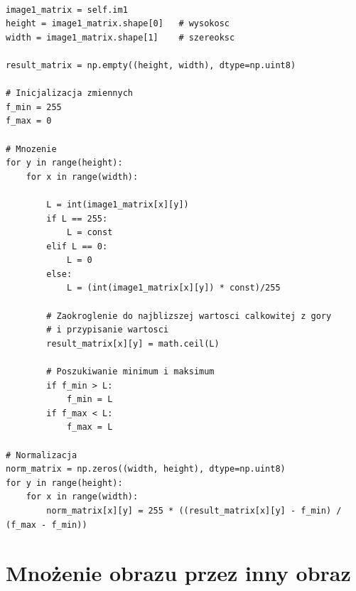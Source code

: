 \documentclass[final,a4paper,openany,12pt]{mwbk}
\begin{document}
\begin{lstlisting}[caption=Mnożenie obrazu szarego przez zadaną liczbę]

image1_matrix = self.im1
height = image1_matrix.shape[0]   # wysokosc
width = image1_matrix.shape[1]    # szereoksc

result_matrix = np.empty((height, width), dtype=np.uint8)

# Inicjalizacja zmiennych
f_min = 255
f_max = 0

# Mnozenie 
for y in range(height):
    for x in range(width):  

        L = int(image1_matrix[x][y]) 
        if L == 255:
            L = const
        elif L == 0:
            L = 0
        else:
            L = (int(image1_matrix[x][y]) * const)/255 

        # Zaokroglenie do najblizszej wartosci calkowitej z gory
        # i przypisanie wartosci
        result_matrix[x][y] = math.ceil(L)

        # Poszukiwanie minimum i maksimum
        if f_min > L:
            f_min = L
        if f_max < L:
            f_max = L

# Normalizacja
norm_matrix = np.zeros((width, height), dtype=np.uint8)
for y in range(height):
    for x in range(width):
        norm_matrix[x][y] = 255 * ((result_matrix[x][y] - f_min) / (f_max - f_min))

\end{lstlisting}






\section {Mnożenie obrazu przez inny obraz}
\hfill
\\\\
\indent
\end{document}
